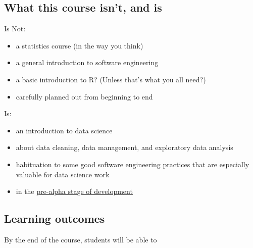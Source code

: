 \documentclass[
]{article}
\providecommand{\tightlist}{%
  \setlength{\itemsep}{0pt}\setlength{\parskip}{0pt}}
\begin{document}
\hypertarget{what-this-course-isnt-and-is}{%
\subsection{What this course isn't, and is}\label{what-this-course-isnt-and-is}}

Is Not:

\begin{itemize}
\tightlist
\item
  a statistics course (in the way you think)
\item
  a general introduction to software engineering
\item
  a basic introduction to R? (Unless that's what you all need?)
\item
  carefully planned out from beginning to end
\end{itemize}

Is:

\begin{itemize}
\tightlist
\item
  an introduction to data science
\item
  about data cleaning, data management, and exploratory data analysis
\item
  habituation to some good software engineering practices that are especially valuable for data science work
\item
  in the \href{https://en.wikipedia.org/wiki/Software_release_life_cycle\#Pre-alpha}{pre-alpha stage of development}
\end{itemize}

\hypertarget{learning-outcomes}{%
\subsection{Learning outcomes}\label{learning-outcomes}}

By the end of the course, students will be able to
\end{document}
